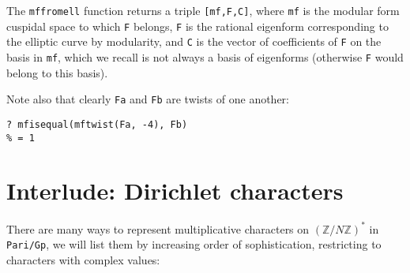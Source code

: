 \documentclass[11pt]{article}
\newcommand{\Z}{{\mathbb Z}}
\def\kbd#1{{\tt #1}}
\begin{document}
The \kbd{mffromell} function returns a triple \kbd{[mf,F,C]},
where \kbd{mf} is the modular form cuspidal space to which \kbd{F} belongs,
\kbd{F} is the rational eigenform corresponding to the elliptic curve by
modularity, and \kbd{C} is the vector of coefficients of \kbd{F} on the
basis in \kbd{mf}, which we recall is not always a basis of eigenforms
(otherwise \kbd{F} would belong to this basis).

Note also that clearly \kbd{Fa} and \kbd{Fb} are twists of one another:

\begin{verbatim}
? mfisequal(mftwist(Fa, -4), Fb)
% = 1
\end{verbatim}

\section{Interlude: Dirichlet characters}

There are many ways to represent multiplicative characters on $(\Z/N\Z)^*$ in
\kbd{Pari/Gp}, we will list them by increasing order of sophistication,
restricting to characters with complex values:
\end{document}
